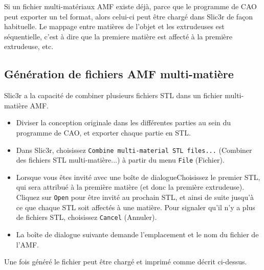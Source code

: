 Si un fichier multi-mat\'eriaux AMF existe d\'ej\`a, parce que le programme de CAO peut exporter un tel format, alors celui-ci peut \^etre charg\'e dans Slic3r de façon habituelle. Le mappage entre mati\`eres de l'objet et les extrudeuses est s\'equentielle, c'est \`a dire que la premiere mati\`ere est affect\'e \`a la premi\`ere extrudeuse, etc.



\subsection{G\'en\'eration de fichiers AMF multi-mati\`ere} %
\label{sub:generating_multi_material_amf_files}

Slic3r a la capacit\'e de combiner plusieurs fichiers STL dans un fichier multi-mati\`ere AMF.


\begin{itemize}
    \item Diviser la conception originale dans les diff\'erentes parties au sein du programme de CAO, et exporter chaque partie en STL.
    \item Dans Slic3r, choisissez \texttt{Combine multi-material STL files...} (Combiner des fichiers STL multi-mati\`ere...) \`a partir du menu \texttt{File} (Fichier).
    \item Lorsque vous \^etes invit\'e avec une bo\^ite de dialogueChoisissez le premier STL, qui sera attribu\'e \`a la premi\`ere mati\`ere (et donc la premi\`ere extrudeuse). Cliquez sur \texttt{Open} pour \^etre invit\'e au prochain STL, et ainsi de suite jusqu'\`a ce que chaque STL soit affect\'es \`a une mati\`ere. Pour signaler qu'il n'y a plus de fichiers STL, choisissez \texttt{Cancel} (Annuler).
    \item La bo\^ite de dialogue suivante demande l'emplacement et le nom du fichier de l'AMF.
\end{itemize}

Une fois g\'en\'er\'e le fichier peut \^etre charg\'e et imprim\'e comme d\'ecrit ci-dessus.


